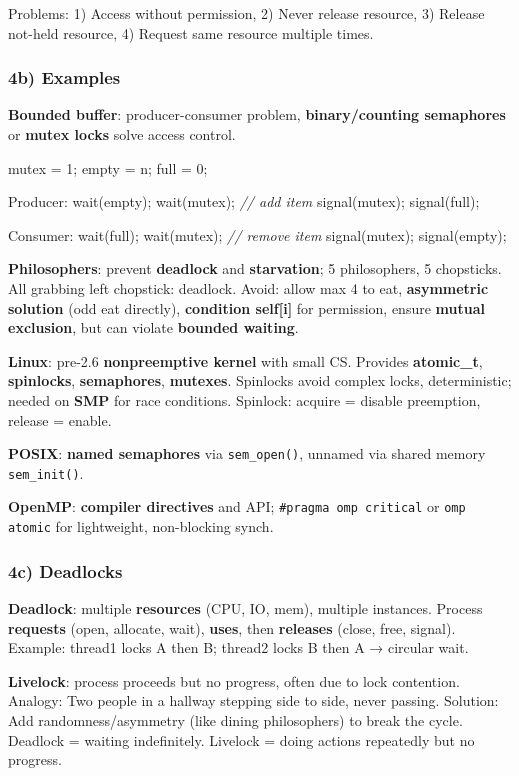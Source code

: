 Problems: 1) Access without permission, 2) Never release resource, 3) Release not-held resource, 4) Request same resource multiple times.


\subsubsection*{4b) Examples}
\textbf{Bounded buffer}: producer-consumer problem, \textbf{binary/counting semaphores} or \textbf{mutex locks} solve access control.

mutex = 1;
empty = n;
full = 0;

Producer:
wait(empty);
wait(mutex);
\textit{// add item}
signal(mutex);
signal(full);

Consumer:
wait(full);
wait(mutex);
\textit{// remove item}
signal(mutex);
signal(empty);

\textbf{Philosophers}: prevent \textbf{deadlock} and \textbf{starvation}; 5 philosophers, 5 chopsticks. All grabbing left chopstick: deadlock. Avoid: allow max 4 to eat, \textbf{asymmetric solution} (odd eat directly), \textbf{condition self[i]} for permission, ensure \textbf{mutual exclusion}, but can violate \textbf{bounded waiting}.

\textbf{Linux}: pre-2.6 \textbf{nonpreemptive kernel} with small CS. Provides \textbf{atomic\_t}, \textbf{spinlocks}, \textbf{semaphores}, \textbf{mutexes}. Spinlocks avoid complex locks, deterministic; needed on \textbf{SMP} for race conditions. Spinlock: acquire = disable preemption, release = enable.

\textbf{POSIX}: \textbf{named semaphores} via \texttt{sem\_open()}, unnamed via shared memory \texttt{sem\_init()}.

\textbf{OpenMP}: \textbf{compiler directives} and API; \texttt{\#pragma omp critical} or \texttt{omp atomic} for lightweight, non-blocking synch.


\subsubsection*{4c) Deadlocks}
\textbf{Deadlock}: multiple \textbf{resources} (CPU, IO, mem), multiple instances. Process \textbf{requests} (open, allocate, wait), \textbf{uses}, then \textbf{releases} (close, free, signal). 
Example: thread1 locks A then B; thread2 locks B then A → circular wait.

\textbf{Livelock}: process proceeds but no progress, often due to lock contention.
Analogy: Two people in a hallway stepping side to side, never passing.
Solution: Add randomness/asymmetry (like dining philosophers) to break the cycle.
Deadlock = waiting indefinitely. Livelock = doing actions repeatedly but no progress.

